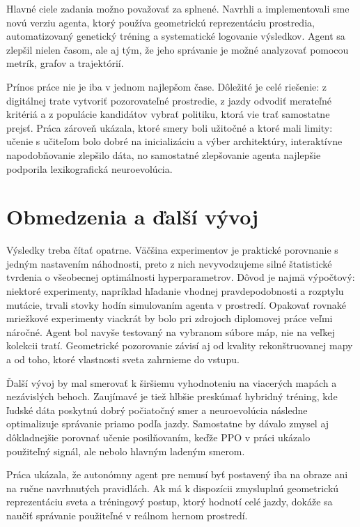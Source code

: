 Hlavné ciele zadania možno považovať za splnené. Navrhli a implementovali sme novú verziu agenta, ktorý používa geometrickú reprezentáciu prostredia, automatizovaný genetický tréning a systematické logovanie výsledkov. Agent sa zlepšil nielen časom, ale aj tým, že jeho správanie je možné analyzovať pomocou metrík, grafov a trajektórií.

Prínos práce nie je iba v jednom najlepšom čase. Dôležité je celé riešenie: z digitálnej trate vytvoriť pozorovateľné prostredie, z jazdy odvodiť merateľné kritériá a z populácie kandidátov vybrať politiku, ktorá vie trať samostatne prejsť. Práca zároveň ukázala, ktoré smery boli užitočné a ktoré mali limity: učenie s učiteľom bolo dobré na inicializáciu a výber architektúry, interaktívne napodobňovanie zlepšilo dáta, no samostatné zlepšovanie agenta najlepšie podporila lexikografická neuroevolúcia.

\section*{Obmedzenia a ďalší vývoj}

Výsledky treba čítať opatrne. Väčšina experimentov je praktické porovnanie s jedným nastavením náhodnosti, preto z nich nevyvodzujeme silné štatistické tvrdenia o všeobecnej optimálnosti hyperparametrov. Dôvod je najmä výpočtový: niektoré experimenty, napríklad hľadanie vhodnej pravdepodobnosti a rozptylu mutácie, trvali stovky hodín simulovaním agenta v prostredí. Opakovať rovnaké mriežkové experimenty viackrát by bolo pri zdrojoch diplomovej práce veľmi náročné. Agent bol navyše testovaný na vybranom súbore máp, nie na veľkej kolekcii tratí. Geometrické pozorovanie závisí aj od kvality rekonštruovanej mapy a od toho, ktoré vlastnosti sveta zahrnieme do vstupu.

Ďalší vývoj by mal smerovať k širšiemu vyhodnoteniu na viacerých mapách a nezávislých behoch. Zaujímavé je tiež hlbšie preskúmať hybridný tréning, kde ľudské dáta poskytnú dobrý počiatočný smer a neuroevolúcia následne optimalizuje správanie priamo podľa jazdy. Samostatne by dávalo zmysel aj dôkladnejšie porovnať učenie posilňovaním, keďže PPO v práci ukázalo použiteľný signál, ale nebolo hlavným ladeným smerom.

Práca ukázala, že autonómny agent pre \Trackmania{} nemusí byť postavený iba na obraze ani na ručne navrhnutých pravidlách. Ak má k dispozícii zmysluplnú geometrickú reprezentáciu sveta a tréningový postup, ktorý hodnotí celé jazdy, dokáže sa naučiť správanie použiteľné v reálnom hernom prostredí.
